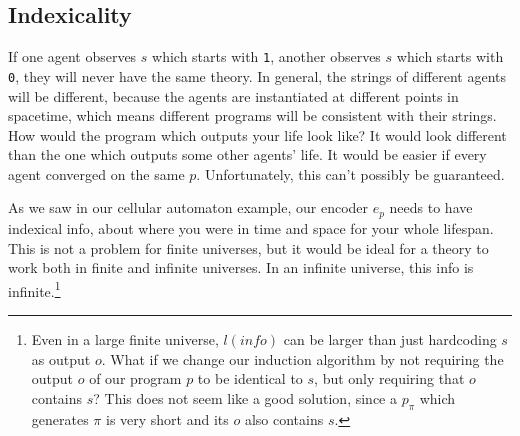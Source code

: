 \documentclass[oneside,hidelinks]{article}
\begin{document}
\newpage

\subsection{Indexicality}

If one agent observes $s$ which starts with \texttt{1}, another observes $s$ which starts with \texttt{0}, they will never have the same theory.
In general, the strings of different agents will be different, because the agents are instantiated at different points in spacetime, which means different programs will be consistent with their strings.
How would the program which outputs your life look like?
It would look different than the one which outputs some other agents' life.
It would be easier if every agent converged on the same $p$.
Unfortunately, this can't possibly be guaranteed.

As we saw in our cellular automaton example, our encoder $e_p$ needs to have indexical info, about where you were in time and space for your whole lifespan.
This is not a problem for finite universes, but it would be ideal for a theory to work both in finite and infinite universes.
In an infinite universe, this info is infinite.\footnote{
Even in a large finite universe, $l(info)$ can be larger than just hardcoding $s$ as output $o$.
What if we change our induction algorithm by not requiring the output $o$ of our program $p$ to be identical to $s$, but only requiring that $o$ contains $s$?
This does not seem like a good solution, since a $p_\pi$ which generates $\pi$ is very short and its $o$ also contains $s$.
}
\end{document}
